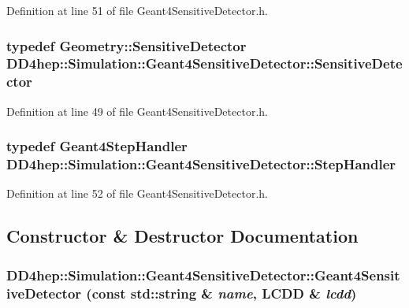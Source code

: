 Definition at line 51 of file Geant4SensitiveDetector.h.\hypertarget{class_d_d4hep_1_1_simulation_1_1_geant4_sensitive_detector_a6375f9a4f776b531e443483ff9fa8c28}{
\subsubsection[{SensitiveDetector}]{\setlength{\rightskip}{0pt plus 5cm}typedef {\bf Geometry::SensitiveDetector} {\bf DD4hep::Simulation::Geant4SensitiveDetector::SensitiveDetector}}}
\label{class_d_d4hep_1_1_simulation_1_1_geant4_sensitive_detector_a6375f9a4f776b531e443483ff9fa8c28}


Definition at line 49 of file Geant4SensitiveDetector.h.\hypertarget{class_d_d4hep_1_1_simulation_1_1_geant4_sensitive_detector_ad8f31d0680aa437d6eb7242292e50a15}{
\subsubsection[{StepHandler}]{\setlength{\rightskip}{0pt plus 5cm}typedef {\bf Geant4StepHandler} {\bf DD4hep::Simulation::Geant4SensitiveDetector::StepHandler}}}
\label{class_d_d4hep_1_1_simulation_1_1_geant4_sensitive_detector_ad8f31d0680aa437d6eb7242292e50a15}


Definition at line 52 of file Geant4SensitiveDetector.h.

\subsection{Constructor \& Destructor Documentation}
\hypertarget{class_d_d4hep_1_1_simulation_1_1_geant4_sensitive_detector_a2630f603ed8098fe28faa6b7c29b585d}{
\subsubsection[{Geant4SensitiveDetector}]{\setlength{\rightskip}{0pt plus 5cm}DD4hep::Simulation::Geant4SensitiveDetector::Geant4SensitiveDetector (const std::string \& {\em name}, \/  {\bf LCDD} \& {\em lcdd})}}
\label{class_d_d4hep_1_1_simulation_1_1_geant4_sensitive_detector_a2630f603ed8098fe28faa6b7c29b585d}


